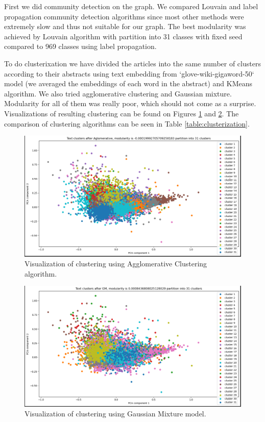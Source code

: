 \documentclass{article}
\begin{document}
First we did community detection on the graph. We compared Louvain and label propagation community detection algorithms since most other methods were extremely slow and thus not suitable for our graph. The best modularity was achieved by Louvain algorithm with partition into 31 classes with fixed seed compared to 969 classes using label propagation. 

To do clusterixation we have divided the articles into the same number of clusters according to their abstracts using text embedding from `glove-wiki-gigaword-50` model (we averaged the embeddings of each word in the abstract) and KMeans algorithm. We also tried agglomerative clustering and Gaussian mixture. Modularity for all of them was really poor, which should not come as a surprise. Visualizations of resulting clustering can be found on Figures \ref{plot:clustering:agglomerative} and \ref{plot:clustering:gaussian_mixture}. The comparison of clustering algorithms can be seen in Table \ref{table:clusterization}.

\begin{figure}[h]
\centering
\includegraphics[width=1\linewidth]{Aglomerative.png}
\caption{Visualization of clustering using Agglomerative Clustering algorithm.}
\label{plot:clustering:agglomerative}
\end{figure}

\begin{figure}[h]
\centering
\includegraphics[width=1\linewidth]{gm.png}
\caption{Visualization of clustering using Gaussian Mixture model.}
\label{plot:clustering:gaussian_mixture}
\end{figure}
\end{document}
